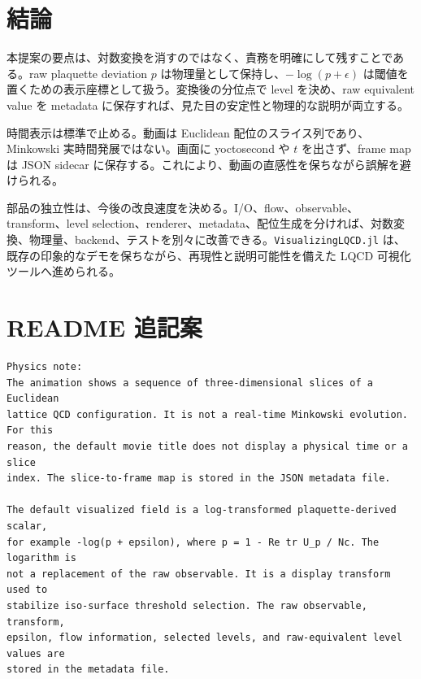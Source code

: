 \documentclass[uplatex,dvipdfmx,ja=standard,11pt,a4paper]{bxjsarticle}
\newcommand{\Visualizing}{\texttt{VisualizingLQCD.jl}}
\begin{document}
\section{結論}
本提案の要点は、対数変換を消すのではなく、責務を明確にして残すことである。raw plaquette deviation \(p\) は物理量として保持し、\(-\log(p+\epsilon)\) は閾値を置くための表示座標として扱う。変換後の分位点で level を決め、raw equivalent value を metadata に保存すれば、見た目の安定性と物理的な説明が両立する。

時間表示は標準で止める。動画は Euclidean 配位のスライス列であり、Minkowski 実時間発展ではない。画面に yoctosecond や \(t\) を出さず、frame map は JSON sidecar に保存する。これにより、動画の直感性を保ちながら誤解を避けられる。

部品の独立性は、今後の改良速度を決める。I/O、flow、observable、transform、level selection、renderer、metadata、配位生成を分ければ、対数変換、物理量、backend、テストを別々に改善できる。\Visualizing{} は、既存の印象的なデモを保ちながら、再現性と説明可能性を備えた LQCD 可視化ツールへ進められる。

\clearpage
\appendix
\section{README 追記案}
\begin{lstlisting}[style=julia,caption={README 追記の下書き}]
Physics note:
The animation shows a sequence of three-dimensional slices of a Euclidean
lattice QCD configuration. It is not a real-time Minkowski evolution. For this
reason, the default movie title does not display a physical time or a slice
index. The slice-to-frame map is stored in the JSON metadata file.

The default visualized field is a log-transformed plaquette-derived scalar,
for example -log(p + epsilon), where p = 1 - Re tr U_p / Nc. The logarithm is
not a replacement of the raw observable. It is a display transform used to
stabilize iso-surface threshold selection. The raw observable, transform,
epsilon, flow information, selected levels, and raw-equivalent level values are
stored in the metadata file.
\end{lstlisting}
\end{document}
